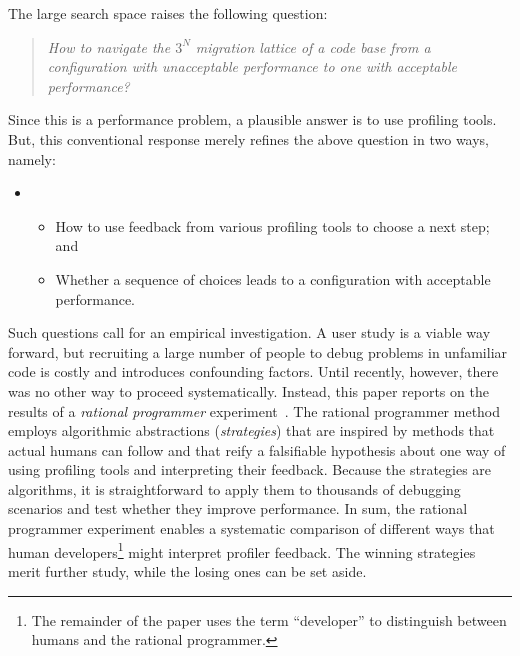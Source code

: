 The large search space raises the following question:
\begin{quote} \em
 How to navigate the $3^N$ migration lattice of a code base from a
  configuration with unacceptable performance to one with acceptable
  performance?
\end{quote}
Since this is a performance problem, a plausible answer is to use profiling tools.
But, this conventional response merely refines the above question in two
ways, namely:
\begin{itemize} \item[] \begin{itemize}\em
\item How to use feedback from various profiling tools to choose a next step; and
\item Whether a sequence of choices leads to a configuration with
  acceptable performance.
\end{itemize} \end{itemize}

Such questions call for an empirical investigation.
A user study is a viable way forward, but recruiting a large number
of people to debug problems in unfamiliar code is costly and introduces
confounding factors.
Until recently, however, there was no other way to proceed systematically.
Instead, this paper reports on the results of a \emph{rational programmer}
experiment~\cite{lksfd-popl-2020,lgfd-icfp-2021,lgfd-icfp-2023}.
The rational programmer method employs algorithmic abstractions (\emph{strategies})
that are inspired by methods that actual humans can follow and that reify a
falsifiable hypothesis about one way of using profiling tools and
interpreting their feedback.
Because the strategies are algorithms, it is straightforward to apply them
to thousands of debugging scenarios and test whether they improve performance.
In sum, the rational programmer experiment enables a systematic comparison
of different ways that human developers\footnote{The remainder of the
paper uses the term ``developer'' to distinguish between humans and the
rational programmer.} might interpret profiler feedback.
The winning strategies merit further study, while the losing ones can be
set aside.

